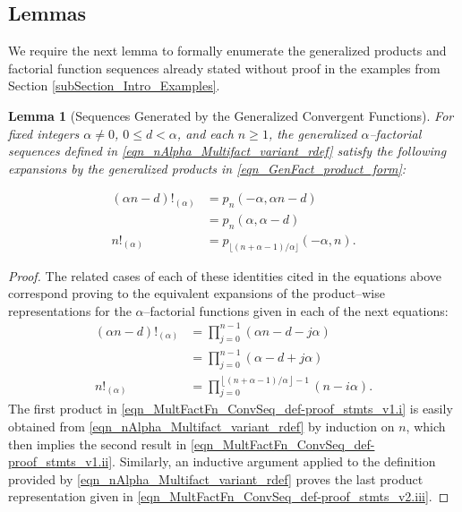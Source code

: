 \documentclass[12pt,reqno]{article}
\renewenvironment{subequations}{%
  \refstepcounter{equation}%
  \edef\theparentequation{\theequation}%
  \setcounter{parentequation}{\value{equation}}%
  \setcounter{equation}{0}%
  \def\theequation{\theparentequation.\alph{equation}}%
  \ignorespaces
}{%
  \setcounter{equation}{\value{parentequation}}%
  \ignorespacesafterend
}
\numberwithin{sfootnote}{section}
\numberwithin{equation}{section}
\theoremstyle{plain}
\newtheorem{lemma}[theorem]{Lemma}
\theoremstyle{definition}
\theoremstyle{remark}
\newcommand{\StartGroupingSubEquations}{\begin{subequations}}
\newcommand{\EndGroupingSubEquations}{\end{subequations}}
\newcommand{\MultiFactorial}[2]{\ensuremath{#1!_{\left(#2\right)}}}
\newcommand{\AlphaFactorial}[2]{\ensuremath{\left(#1\right)!_{\left(#2\right)}}}
\begin{document}
\subsection{Lemmas} 
\label{subSection_Apps_and_Examples_StmtsOfLemmas} 

We require the next lemma 
to formally enumerate the generalized products and factorial function sequences 
already stated without proof in the examples from 
Section \ref{subSection_Intro_Examples}. 

\begin{lemma}[Sequences Generated by the Generalized Convergent Functions] 
\label{lemma_GenConvFn_EnumIdents_pnAlphaRSeq_idents_combined_v1} 
For fixed integers $\alpha \neq 0$, $0 \leq d < \alpha$, and each 
$n \geq 1$, the generalized $\alpha$--factorial sequences 
defined in \eqref{eqn_nAlpha_Multifact_variant_rdef} 
satisfy the following expansions by the generalized products in 
\eqref{eqn_GenFact_product_form}: 
\StartGroupingSubEquations 
\begin{align} 
(\alpha n - d)!_{(\alpha)} 
     & = p_n(-\alpha, \alpha n-d) \\ 
     & = p_n(\alpha, \alpha -d) \\ 
\label{eqn_MultFactFn_ConvSeq_def-stmts_v1.c} 
n!_{(\alpha)} 
     & = p_{\lfloor (n+\alpha-1) / \alpha \rfloor}(-\alpha, n). 
\end{align} 
\EndGroupingSubEquations 
\end{lemma} 
\begin{proof} 
The related cases of each of these identities cited in the 
equations above correspond proving to the 
equivalent expansions of the product--wise representations for the 
$\alpha$--factorial functions given in each of the next equations: 
\begin{align*} 
\label{eqn_MultFactFn_ConvSeq_def-proof_stmts_v1.i} 
\tag{a} 
\AlphaFactorial{\alpha n-d}{\alpha} & = 
     \prod_{j=0}^{n-1} \left(\alpha n - d - j\alpha\right) \\ 
\label{eqn_MultFactFn_ConvSeq_def-proof_stmts_v1.ii} 
\tag{b} 
   & = 
     \prod_{j=0}^{n-1} \left(\alpha - d + j \alpha\right) \\ 
\tag{c} 
\label{eqn_MultFactFn_ConvSeq_def-proof_stmts_v2.iii} 
\MultiFactorial{n}{\alpha} & = 
     \prod\limits_{j=0}^{\left\lfloor (n+\alpha-1) / \alpha 
     \right\rfloor - 1} (n-i\alpha). 
\end{align*} 
The first product in \eqref{eqn_MultFactFn_ConvSeq_def-proof_stmts_v1.i} 
is easily obtained from \eqref{eqn_nAlpha_Multifact_variant_rdef} by 
induction on $n$, which then implies the second result in 
\eqref{eqn_MultFactFn_ConvSeq_def-proof_stmts_v1.ii}. 
Similarly, an inductive argument applied to the definition provided by 
\eqref{eqn_nAlpha_Multifact_variant_rdef} 
proves the last product representation given in 
\eqref{eqn_MultFactFn_ConvSeq_def-proof_stmts_v2.iii}. 
\end{proof} 
\end{document}

